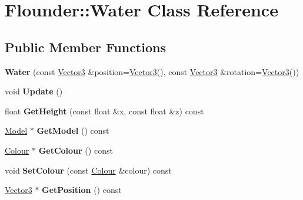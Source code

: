 \hypertarget{class_flounder_1_1_water}{}\section{Flounder\+:\+:Water Class Reference}
\label{class_flounder_1_1_water}
\subsection*{Public Member Functions}
\begin{DoxyCompactItemize}
\item 
\mbox{\label{class_flounder_1_1_water_a5ec752f253babb5a07cb15c8ba88d2f3}} 
{\bfseries Water} (const \hyperlink{class_flounder_1_1_vector3}{Vector3} \&position=\hyperlink{class_flounder_1_1_vector3}{Vector3}(), const \hyperlink{class_flounder_1_1_vector3}{Vector3} \&rotation=\hyperlink{class_flounder_1_1_vector3}{Vector3}())
\item 
\mbox{\label{class_flounder_1_1_water_adc35d6815805dbb7039b9cf56fdc6642}} 
void {\bfseries Update} ()
\item 
\mbox{\label{class_flounder_1_1_water_acb6ab17e095e229a54147639c7943600}} 
float {\bfseries Get\+Height} (const float \&x, const float \&z) const
\item 
\mbox{\label{class_flounder_1_1_water_aa99a46820e03fa3bcf384baa711e94cd}} 
\hyperlink{class_flounder_1_1_model}{Model} $\ast$ {\bfseries Get\+Model} () const
\item 
\mbox{\label{class_flounder_1_1_water_a15eb5018bf8239523569f9b0f549d50d}} 
\hyperlink{class_flounder_1_1_colour}{Colour} $\ast$ {\bfseries Get\+Colour} () const
\item 
\mbox{\label{class_flounder_1_1_water_a62e069e9f129a5694a6141b23da76839}} 
void {\bfseries Set\+Colour} (const \hyperlink{class_flounder_1_1_colour}{Colour} \&colour) const
\item 
\mbox{\label{class_flounder_1_1_water_afa98518be69f5c9870e6feed3ca3546d}} 
\hyperlink{class_flounder_1_1_vector3}{Vector3} $\ast$ {\bfseries Get\+Position} () const

\end{DoxyCompactItemize}
